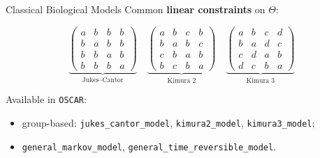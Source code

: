 \documentclass[9pt]{beamer}
\newcommand\OSCAR{\texttt{OSCAR}\xspace}
\begin{document}
\begin{frame}{Classical Biological Models}
  Common \textbf{linear constraints} on $\Theta$:
  \bigskip

  \[
    \underbrace{\begin{pmatrix} a&b&b&b\\ b&a&b&b\\ b&b&a&b\\ b&b&b&a\end{pmatrix}}_{\text{Jukes--Cantor}}
    \quad
    \underbrace{\begin{pmatrix} a&b&c&b\\ b&a&b&c\\ c&b&a&b\\ b&c&b&a\end{pmatrix}}_{\text{Kimura 2}}
    \quad
    \underbrace{\begin{pmatrix} a&b&c&d\\ b&a&d&c\\ c&d&a&b\\ d&c&b&a\end{pmatrix}}_{\text{Kimura 3}}
  \]
  \bigskip
  \pause

  Available in \OSCAR:
  \begin{itemize}
  \item group-based: \texttt{jukes\_cantor\_model}, \texttt{kimura2\_model},
    \texttt{kimura3\_model};
  \item \texttt{general\_markov\_model}, \texttt{general\_time\_reversible\_model}.
  \end{itemize}
\end{frame}
\end{document}
